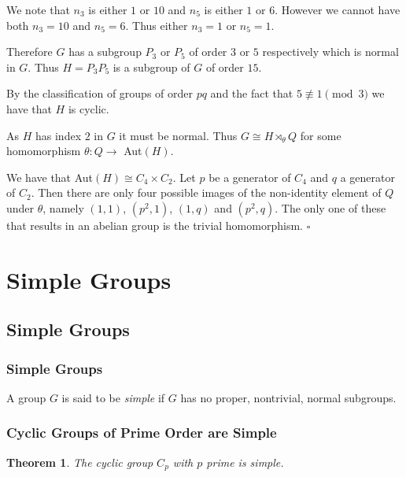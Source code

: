 \documentclass[10pt]{article}
\newtheorem{theorem}{Theorem}[section]
\newenvironment{proof}[1][Proof]{\begin{trivlist}
\item[\hskip \labelsep {\itshape #1}]}{\end{trivlist}}
\newenvironment{definition}[1][Definition]{\begin{trivlist}
\item[\hskip \labelsep {\bfseries #1}]}{\end{trivlist}}
\begin{document}
\begin{proof}
We note that $n_3$ is either $1$ or $10$ and $n_5$ is either $1$ or $6$. However we cannot have both $n_3 = 10$ and $n_5 = 6$. Thus either $n_3 = 1$ or $n_5 = 1$.

Therefore $G$ has a subgroup $P_3$ or $P_5$ of order $3$ or $5$ respectively which is normal in $G$. Thus $H = P_3P_5$ is a subgroup of $G$ of order $15$.

By the classification of groups of order $pq$ and the fact that $5 \not\equiv 1 \pmod{3}$ we have that $H$ is cyclic.

As $H$ has index $2$ in $G$ it must be normal. Thus $G \cong H\rtimes_{\theta} Q$ for some homomorphism $\theta : Q \to$ Aut$(H)$.

We have that Aut$(H) \cong C_4\times C_2$. Let $p$ be a generator of $C_4$ and $q$ a generator of $C_2$. Then there are only four possible images of the non-identity element of $Q$ under $\theta$, namely $(1, 1)$, $(p^2, 1)$, $(1, q)$ and $(p^2, q)$. The only one of these that results in an abelian group is the trivial homomorphism. $\square$
\end{proof}

\section{Simple Groups}

\subsection{Simple Groups}

\subsubsection{Simple Groups}

\begin{definition}
A group $G$ is said to be \emph{simple} if $G$ has no proper, nontrivial, normal subgroups.
\end{definition}

\subsubsection{Cyclic Groups of Prime Order are Simple}

\begin{theorem}
The cyclic group $C_p$ with $p$ prime is simple.
\end{theorem}
\end{document}
